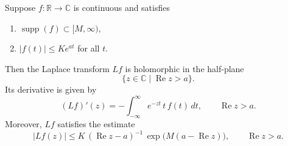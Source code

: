 Suppose $f \colon \mathbb{R} \to \mathbb{C}$ is continuous and satisfies
\begin{enumerate}
\item $\operatorname{supp}(f) \subset [M, \infty)$,
\item $|f(t)| \leq K e^{at}$ for all $t$.
\end{enumerate}
Then the Laplace transform $Lf$ is holomorphic in the half-plane
$$\{z \in \mathbb{C} \mid \operatorname{Re} z > a\}.$$
Its derivative is given by
$$(Lf)'(z) = -\int_{-\infty}^{\infty} e^{-zt} \, t \, f(t) \, dt, \qquad \operatorname{Re} z > a.$$
Moreover, $Lf$ satisfies the estimate
$$|Lf(z)| \leq K \, (\operatorname{Re} z - a)^{-1} \, \exp\!\bigl(M(a - \operatorname{Re} z)\bigr), \qquad \operatorname{Re} z > a.$$
